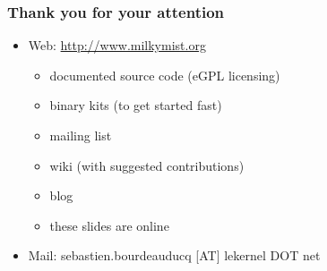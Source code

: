 \documentclass{beamer}
\begin{document}
\frame
{
  \frametitle{Thank you for your attention}
  \begin{itemize}
  \item Web: \url{http://www.milkymist.org}
  \begin{itemize}
  \item documented source code (eGPL licensing)
  \item binary kits (to get started fast)
  \item mailing list
  \item wiki (with suggested contributions)
  \item blog
  \item these slides are online
  \end{itemize}
  \item Mail: sebastien.bourdeauducq [AT] lekernel DOT net
  \end{itemize}

  \begin{center}
  \end{center}
}
\end{document}
